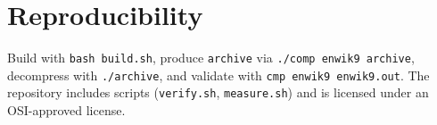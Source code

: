 \documentclass[11pt]{article}
\begin{document}
\section{Reproducibility}
Build with \texttt{bash build.sh}, produce \texttt{archive} via \texttt{./comp enwik9 archive}, decompress with \texttt{./archive}, and validate with \texttt{cmp enwik9 enwik9.out}. The repository includes scripts (\texttt{verify.sh}, \texttt{measure.sh}) and is licensed under an OSI-approved license.
\end{document}
